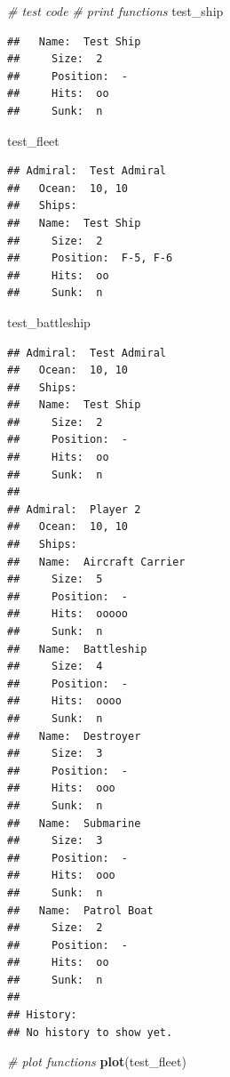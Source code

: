 \documentclass[
]{article}
\newenvironment{Shaded}{\begin{snugshade}}{\end{snugshade}}
\newcommand{\CommentTok}[1]{\textcolor[rgb]{0.56,0.35,0.01}{\textit{#1}}}
\newcommand{\FunctionTok}[1]{\textcolor[rgb]{0.13,0.29,0.53}{\textbf{#1}}}
\newcommand{\NormalTok}[1]{#1}
\begin{document}
\begin{Shaded}
\begin{Highlighting}[]
\CommentTok{\# test code}
\CommentTok{\# print functions}
\NormalTok{test\_ship}
\end{Highlighting}
\end{Shaded}

\begin{verbatim}
##   Name:  Test Ship 
##     Size:  2 
##     Position:  - 
##     Hits:  oo 
##     Sunk:  n
\end{verbatim}

\begin{Shaded}
\begin{Highlighting}[]
\NormalTok{test\_fleet}
\end{Highlighting}
\end{Shaded}

\begin{verbatim}
## Admiral:  Test Admiral 
##   Ocean:  10, 10 
##   Ships:
##   Name:  Test Ship 
##     Size:  2 
##     Position:  F-5, F-6 
##     Hits:  oo 
##     Sunk:  n
\end{verbatim}

\begin{Shaded}
\begin{Highlighting}[]
\NormalTok{test\_battleship}
\end{Highlighting}
\end{Shaded}

\begin{verbatim}
## Admiral:  Test Admiral 
##   Ocean:  10, 10 
##   Ships:
##   Name:  Test Ship 
##     Size:  2 
##     Position:  - 
##     Hits:  oo 
##     Sunk:  n 
## 
## Admiral:  Player 2 
##   Ocean:  10, 10 
##   Ships:
##   Name:  Aircraft Carrier 
##     Size:  5 
##     Position:  - 
##     Hits:  ooooo 
##     Sunk:  n 
##   Name:  Battleship 
##     Size:  4 
##     Position:  - 
##     Hits:  oooo 
##     Sunk:  n 
##   Name:  Destroyer 
##     Size:  3 
##     Position:  - 
##     Hits:  ooo 
##     Sunk:  n 
##   Name:  Submarine 
##     Size:  3 
##     Position:  - 
##     Hits:  ooo 
##     Sunk:  n 
##   Name:  Patrol Boat 
##     Size:  2 
##     Position:  - 
##     Hits:  oo 
##     Sunk:  n 
## 
## History:
## No history to show yet.
\end{verbatim}

\begin{Shaded}
\begin{Highlighting}[]
\CommentTok{\# plot functions}
\FunctionTok{plot}\NormalTok{(test\_fleet)}
\end{Highlighting}
\end{Shaded}
\end{document}
